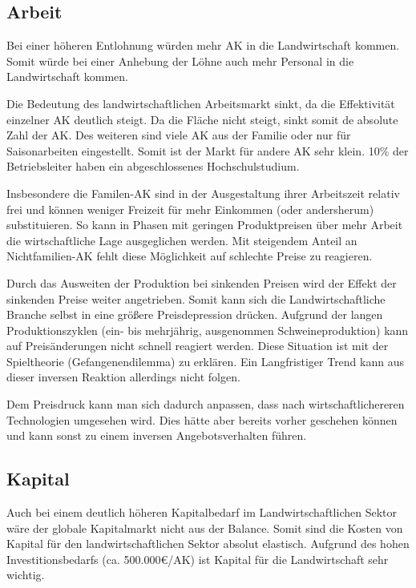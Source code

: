 \documentclass[11pt]{scrbook}
\begin{document}
\subsection{Arbeit}
Bei einer höheren Entlohnung würden mehr \ac{AK} in die Landwirtschaft kommen.
Somit würde bei einer Anhebung der Löhne auch mehr Personal in die Landwirtschaft kommen.

Die Bedeutung des landwirtschaftlichen Arbeitsmarkt sinkt, da die Effektivität einzelner \ac{AK} deutlich steigt.
Da die Fläche nicht steigt, sinkt somit de absolute Zahl der \ac{AK}.
Des weiteren sind viele \ac{AK} aus der Familie oder nur für Saisonarbeiten eingestellt.
Somit ist der Markt für andere \ac{AK} sehr klein.
10\% der Betriebsleiter haben ein abgeschlossenes Hochschulstudium.

Insbesondere die Familen-\ac{AK} sind in der Ausgestaltung ihrer Arbeitszeit relativ frei und können weniger Freizeit für mehr Einkommen (oder andersherum) substituieren.
So kann in Phasen mit geringen Produktpreisen über mehr Arbeit die wirtschaftliche Lage ausgeglichen werden.
Mit steigendem Anteil an Nichtfamilien-\ac{AK} fehlt diese Möglichkeit auf schlechte Preise zu reagieren.

Durch das Ausweiten der Produktion bei sinkenden Preisen wird der Effekt der sinkenden Preise weiter angetrieben.
Somit kann sich die Landwirtschaftliche Branche selbst in eine größere Preisdepression drücken.
Aufgrund der langen Produktionszyklen (ein- bis mehrjährig, ausgenommen Schweineproduktion) kann auf Preisänderungen nicht schnell reagiert werden.
Diese Situation ist mit der Spieltheorie (Gefangenendilemma) zu erklären.
Ein Langfristiger Trend kann aus dieser inversen Reaktion allerdings nicht folgen.

Dem Preisdruck kann man sich dadurch anpassen, dass nach wirtschaftlichereren Technologien umgesehen wird.
Dies hätte aber bereits vorher geschehen können und kann sonst zu einem inversen Angebotsverhalten führen.

\subsection{Kapital}
Auch bei einem deutlich höheren Kapitalbedarf im Landwirtschaftlichen Sektor wäre der globale Kapitalmarkt nicht aus der Balance.
Somit sind die Kosten von Kapital für den landwirtschaftlichen Sektor absolut elastisch.
Aufgrund des hohen Investitionsbedarfs (ca. 500.000€/\ac{AK}) ist Kapital für die Landwirtschaft sehr wichtig.
\end{document}

